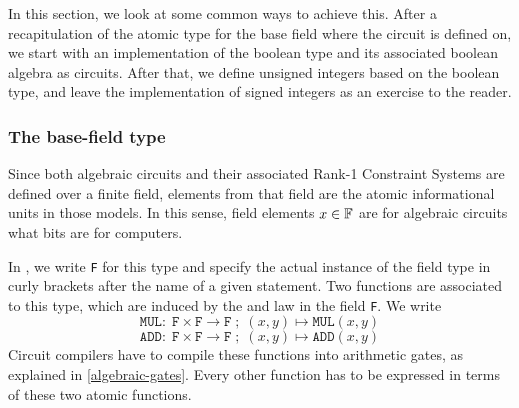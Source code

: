 In this section, we look at some common ways to achieve this. After a recapitulation of the atomic type for the base field where the circuit is defined on, we start with an implementation of the boolean type and its associated boolean algebra as circuits. After that, we define unsigned integers based on the boolean type, and leave the implementation of signed integers as an exercise to the reader. 

\subsubsection{The base-field type} 
\label{def:base_field_type}
Since both algebraic circuits and their associated Rank-1 Constraint Systems are defined over a finite field, elements from that field are the atomic informational units in those models. In this sense, field elements $x\in \mathbb{F}$ are for algebraic circuits what bits are for computers. 

In , we write \texttt{F} for this type and specify the actual instance of the field type in curly brackets after the name of a given statement. Two functions are associated to this type, which are induced by the  and  law in the field \texttt{F}. We write
\begin{equation}
\mathtt{MUL}:\; \mathtt{F} \times \mathtt{F} \to \mathtt{F}\;;\; (x,y) \mapsto \mathtt{MUL}(x,y)
\end{equation}
\begin{equation}
\mathtt{ADD}:\; \mathtt{F} \times \mathtt{F} \to \mathtt{F}\;;\; (x,y) \mapsto \mathtt{ADD}(x,y)
\end{equation}
Circuit compilers have to compile these functions into arithmetic gates, as explained in \ref{algebraic-gates}. Every other function has to be expressed in terms of these two atomic functions.

